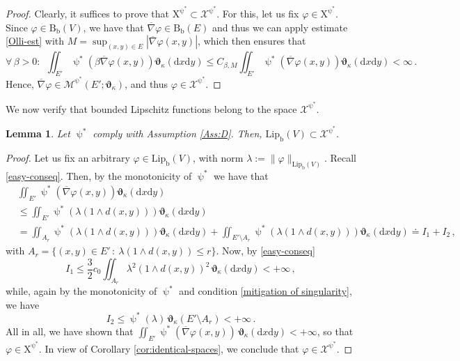 \documentclass[11pt,reqno]{amsart}
\numberwithin{equation}{section}
\newcommand{\Lip}{\mathrm{Lip}}
\newcommand{\Lipb}{\mathrm{Lip}_{\mathrm{b}}}
\newcommand{\dd}{\mathrm{d}}
\newtheorem{lemma}[theorem]{Lemma}
\theoremstyle{definition}
\def\dd{\mathrm{d}}
\newcommand{\Bb}{\mathrm{B}_{\mathrm b}}
\newcommand{\teta}{\boldsymbol \vartheta}
\newcommand{\tetapi}{\boldsymbol{\teta}_{\kappa}}
\newcommand{\Ed}{{E'}}
\newcommand{\rmX}{\mathrm{X}}
\newcommand{\TODO}[1]{\todo[inline, color=cyan!20]{#1}}
\numberwithin{equation}{section}
\begin{document}
\begin{proof}
Clearly, it suffices to prove that $  \rmX^{\uppsi^*} \subset \mathcal{X}^{\uppsi^*}$. For this, let us fix 
$\varphi \in  \rmX^{\uppsi^*}$. Since $\varphi \in \Bb(V)$, we have that $\overline\nabla \varphi 
\in \Bb(E)$ and thus we can apply estimate \eqref{Olli-est} with $M = \sup_{(x,y)\in E}|\overline \nabla \varphi(x,y)|$, which then ensures that 
\[
\forall\, \beta>0: \ \ \iint_{\Ed} \uppsi^*(\beta \overline\nabla \varphi (x,y)) \tetapi(\dd x \dd y )\leq C_{\beta,M} \iint_{\Ed} \uppsi^*(\overline\nabla \varphi (x,y)) \tetapi(\dd x \dd y )<\infty\,.
\]
Hence, $\overline \nabla \varphi \in \mathcal{M}^{\uppsi^*}(\Ed;\tetapi)$, and thus $\varphi \in  \mathcal{X}^{\uppsi^*}$.
\end{proof}
\par
We now verify that  bounded Lipschitz functions belong to the space $\mathcal{X}^{\uppsi^*} $. 
%
\begin{lemma}
\label{l:Lipb-r-nice}
Let $\uppsi^*$ comply with Assumption \ref{Ass:D}.  Then, $\Lipb(V) \subset \mathcal{X}^{\uppsi^*} $.
\end{lemma}
\begin{proof}
Let us fix an arbitrary $\varphi \in \Lipb(V)$, with norm  $\lambda:=\| \varphi \|_{\Lip_{\mathrm{b}}(V)}$. 
 Recall
\eqref{easy-conseq}. Then, by the monotonicity of $\uppsi^*$ we have that 
\[
\begin{aligned}
&
\iint_{\Ed} \uppsi^*(\overline \nabla \varphi(x,y)) \tetapi (\dd x \dd y ) 
\\
& \leq \iint_{\Ed} \uppsi^*(\lambda (1{\wedge}d(x,y))) \tetapi (\dd x \dd y )
\\ & 
=  \iint_{A_r} \uppsi^*(\lambda (1{\wedge}d(x,y))) \tetapi (\dd x \dd y ) + \iint_{\Ed{\setminus}A_r} \uppsi^*(\lambda (1{\wedge}d(x,y))) \tetapi (\dd x \dd y ) 
\doteq I_1+I_2\,,
\end{aligned}
\]
with 
$A_r = \{ (x,y)\in \Ed\, : \ \lambda (1{\wedge}d(x,y)) \leq r\} $. Now, by \eqref{easy-conseq}
\[
I_1 \leq  \frac{3}2 c_0 \iint_{A_r} \lambda^2 (1{\wedge}d(x,y))^2 \,  \tetapi (\dd x \dd y )<+\infty\,,
\]
while, again by the monotonicity of $\uppsi^*$  and condition \eqref{mitigation of singularity}, we have 
\[
I_2 \leq \uppsi^*(\lambda)\, \tetapi (\Ed{\setminus}A_r) <+\infty\,.
\]
All in all, we have shown that $\iint_{\Ed} \uppsi^*(\overline \nabla \varphi(x,y))\, \tetapi (\dd x \dd y )<+\infty$, so that $\varphi \in \rmX^{\uppsi^*}$. 
In view of Corollary \ref{cor:identical-spaces}, we conclude that 
$\varphi \in \mathcal{X}^{\uppsi^*}$.
\TODO{Shorten prove above!}
\end{proof}
\end{document}

